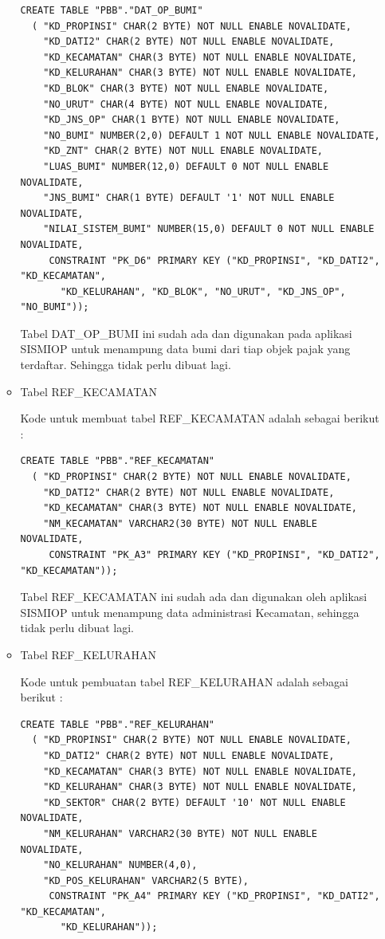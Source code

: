 \documentclass[pdftex,12pt, oneside]{article}
\begin{document}
\begin{enumerate}[1.]
\begin{itemize}
\begin{lstlisting}
CREATE TABLE "PBB"."DAT_OP_BUMI" 
  (	"KD_PROPINSI" CHAR(2 BYTE) NOT NULL ENABLE NOVALIDATE, 
	"KD_DATI2" CHAR(2 BYTE) NOT NULL ENABLE NOVALIDATE, 
	"KD_KECAMATAN" CHAR(3 BYTE) NOT NULL ENABLE NOVALIDATE, 
	"KD_KELURAHAN" CHAR(3 BYTE) NOT NULL ENABLE NOVALIDATE, 
	"KD_BLOK" CHAR(3 BYTE) NOT NULL ENABLE NOVALIDATE, 
	"NO_URUT" CHAR(4 BYTE) NOT NULL ENABLE NOVALIDATE, 
	"KD_JNS_OP" CHAR(1 BYTE) NOT NULL ENABLE NOVALIDATE, 
	"NO_BUMI" NUMBER(2,0) DEFAULT 1 NOT NULL ENABLE NOVALIDATE, 
	"KD_ZNT" CHAR(2 BYTE) NOT NULL ENABLE NOVALIDATE, 
	"LUAS_BUMI" NUMBER(12,0) DEFAULT 0 NOT NULL ENABLE NOVALIDATE, 
	"JNS_BUMI" CHAR(1 BYTE) DEFAULT '1' NOT NULL ENABLE NOVALIDATE, 
	"NILAI_SISTEM_BUMI" NUMBER(15,0) DEFAULT 0 NOT NULL ENABLE NOVALIDATE, 
	 CONSTRAINT "PK_D6" PRIMARY KEY ("KD_PROPINSI", "KD_DATI2", "KD_KECAMATAN", 
	   "KD_KELURAHAN", "KD_BLOK", "NO_URUT", "KD_JNS_OP", "NO_BUMI"));
\end{lstlisting}

	Tabel DAT\_OP\_BUMI ini sudah ada dan digunakan pada aplikasi SISMIOP untuk menampung data bumi dari tiap objek pajak yang terdaftar. Sehingga tidak perlu dibuat lagi.
	
	\item Tabel REF\_KECAMATAN
	
	Kode untuk membuat tabel REF\_KECAMATAN adalah sebagai berikut :
	
\begin{lstlisting}
CREATE TABLE "PBB"."REF_KECAMATAN" 
  (	"KD_PROPINSI" CHAR(2 BYTE) NOT NULL ENABLE NOVALIDATE, 
	"KD_DATI2" CHAR(2 BYTE) NOT NULL ENABLE NOVALIDATE, 
	"KD_KECAMATAN" CHAR(3 BYTE) NOT NULL ENABLE NOVALIDATE, 
	"NM_KECAMATAN" VARCHAR2(30 BYTE) NOT NULL ENABLE NOVALIDATE, 
	 CONSTRAINT "PK_A3" PRIMARY KEY ("KD_PROPINSI", "KD_DATI2", "KD_KECAMATAN"));
\end{lstlisting}

	Tabel REF\_KECAMATAN ini sudah ada dan digunakan oleh aplikasi SISMIOP untuk menampung data administrasi Kecamatan, sehingga tidak perlu dibuat lagi.
	
	\item Tabel REF\_KELURAHAN
	
	Kode untuk pembuatan tabel REF\_KELURAHAN adalah sebagai berikut :
	
\begin{lstlisting}
CREATE TABLE "PBB"."REF_KELURAHAN" 
  (	"KD_PROPINSI" CHAR(2 BYTE) NOT NULL ENABLE NOVALIDATE, 
	"KD_DATI2" CHAR(2 BYTE) NOT NULL ENABLE NOVALIDATE, 
	"KD_KECAMATAN" CHAR(3 BYTE) NOT NULL ENABLE NOVALIDATE, 
	"KD_KELURAHAN" CHAR(3 BYTE) NOT NULL ENABLE NOVALIDATE, 
	"KD_SEKTOR" CHAR(2 BYTE) DEFAULT '10' NOT NULL ENABLE NOVALIDATE, 
	"NM_KELURAHAN" VARCHAR2(30 BYTE) NOT NULL ENABLE NOVALIDATE, 
	"NO_KELURAHAN" NUMBER(4,0), 
	"KD_POS_KELURAHAN" VARCHAR2(5 BYTE), 
	 CONSTRAINT "PK_A4" PRIMARY KEY ("KD_PROPINSI", "KD_DATI2", "KD_KECAMATAN", 
	   "KD_KELURAHAN"));
\end{lstlisting}


\end{itemize}
\end{enumerate}
\end{document}
